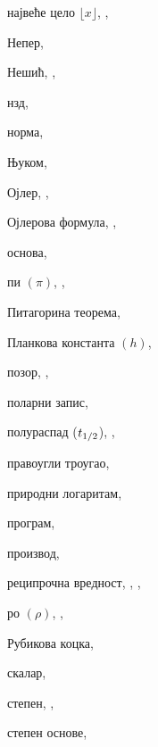 \begin{theindex}
  \indexspace

  \item највеће цело $\lfloor x\rfloor$, , 
  \item Непер, 
  \item Нешић, , 
  \item нзд, 
  \item норма, 

  \indexspace

  \item Њуком, 

  \indexspace

  \item Ојлер, , 
  \item Ојлерова формула, , 
  \item основа, 

  \indexspace

  \item пи $(\pi)$, , 
  \item Питагорина теорема, 
  \item Планкова константа $(h)$, 
  \item позор, , 
  \item поларни запис, 
  \item полураспад ($t_{1/2}$), , 
  \item правоугли троугао, 
  \item природни логаритам, 
  \item програм, 
  \item производ, 

  \indexspace

  \item реципрочна вредност, , 
		, 
  \item ро $(\rho)$, , 
  \item Рубикова коцка, 

  \indexspace

  \item скалар, 
  \item степен, , 
  \item степен основе, 


\end{theindex}
